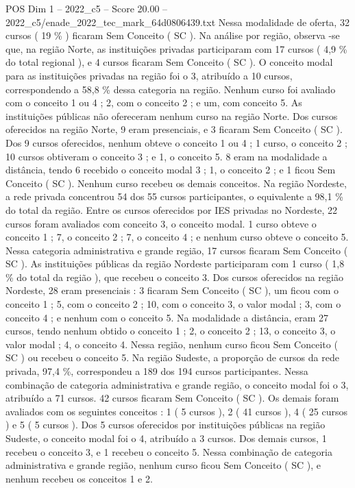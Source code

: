 \begin{textsample}{POS Dim 1 – 2022\_c5 – Score 20.00 – 2022\_c5/enade\_2022\_tec\_mark\_64d0806439.txt}
Nessa modalidade de oferta, 32 cursos ( 19 \% ) ficaram Sem Conceito ( SC ).
Na análise por região, observa -se que, na região Norte, as instituições privadas participaram com 17 cursos ( 4,9 \% do total regional ), e 4 cursos ficaram Sem Conceito ( SC ).
O conceito modal para as instituições privadas na região foi o 3, atribuído a 10 cursos, correspondendo a 58,8 \% dessa categoria na região.
Nenhum curso foi avaliado com o conceito 1 ou 4 ; 2, com o conceito 2 ; e um, com conceito 5.
As instituições públicas não ofereceram nenhum curso na região Norte.
Dos cursos oferecidos na região Norte, 9 eram presenciais, e 3 ficaram Sem Conceito ( SC ).
Dos 9 cursos oferecidos, nenhum obteve o conceito 1 ou 4 ; 1 curso, o conceito 2 ; 10 cursos obtiveram o conceito 3 ; e 1, o conceito 5. 8 eram na modalidade a distância, tendo 6 recebido o conceito modal 3 ; 1, o conceito 2 ; e 1 ficou Sem Conceito ( SC ).
Nenhum curso recebeu os demais conceitos.
Na região Nordeste, a rede privada concentrou 54 dos 55 cursos participantes, o equivalente a 98,1 \% do total da região.
Entre os cursos oferecidos por IES privadas no Nordeste, 22 cursos foram avaliados com conceito 3, o conceito modal. 1 curso obteve o conceito 1 ; 7, o conceito 2 ; 7, o conceito 4 ; e nenhum curso obteve o conceito 5.
Nessa categoria administrativa e grande região, 17 cursos ficaram Sem Conceito ( SC ).
As instituições públicas da região Nordeste participaram com 1 curso ( 1,8 \% do total da região ), que recebeu o conceito 3.
Dos cursos oferecidos na região Nordeste, 28 eram presenciais : 3 ficaram Sem Conceito ( SC ), um ficou com o conceito 1 ; 5, com o conceito 2 ; 10, com o conceito 3, o valor modal ; 3, com o conceito 4 ; e nenhum com o conceito 5.
Na modalidade a distância, eram 27 cursos, tendo nenhum obtido o conceito 1 ; 2, o conceito 2 ; 13, o conceito 3, o valor modal ; 4, o conceito 4.
Nessa região, nenhum curso ficou Sem Conceito ( SC ) ou recebeu o conceito 5.
Na região Sudeste, a proporção de cursos da rede privada, 97,4 \%, correspondeu a 189 dos 194 cursos participantes.
Nessa combinação de categoria administrativa e grande região, o conceito modal foi o 3, atribuído a 71 cursos. 42 cursos ficaram Sem Conceito ( SC ).
Os demais foram avaliados com os seguintes conceitos : 1 ( 5 cursos ), 2 ( 41 cursos ), 4 ( 25 cursos ) e 5 ( 5 cursos ).
Dos 5 cursos oferecidos por instituições públicas na região Sudeste, o conceito modal foi o 4, atribuído a 3 cursos.
Dos demais cursos, 1 recebeu o conceito 3, e 1 recebeu o conceito 5.
Nessa combinação de categoria administrativa e grande região, nenhum curso ficou Sem Conceito ( SC ), e nenhum recebeu os conceitos 1 e 2.

\end{textsample}
